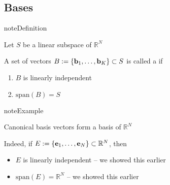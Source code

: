 \documentclass[letterpaper,10pt,english]{jupyterBook}
\begin{document}
\subsection{Bases}
\label{\detokenize{05.linear_algebra:bases}}
\begin{sphinxadmonition}{note}{Definition}

\sphinxAtStartPar
Let \(S\) be a linear subspace of \(\mathbb{R}^N\)

\sphinxAtStartPar
A set of vectors \(B := \{{\bf b}_1, \ldots, {\bf b}_K\} \subset S\) is
called a  if
\begin{enumerate}
%
\item {} 
\sphinxAtStartPar
\(B\) is linearly independent

\item {} 
\sphinxAtStartPar
\(\mathrm{span}(B) = S\)

\end{enumerate}
\end{sphinxadmonition}

\begin{sphinxadmonition}{note}{Example}

\sphinxAtStartPar
Canonical basis vectors form a basis of \(\mathbb{R}^N\)
\end{sphinxadmonition}

\sphinxAtStartPar
Indeed, if \(E := \{{\bf e}_1, \ldots, {\bf e}_N\} \subset \mathbb{R}^N\), then
\begin{itemize}
\item {} 
\sphinxAtStartPar
\(E\) is linearly independent – we showed this earlier

\item {} 
\sphinxAtStartPar
\(\mathrm{span}(E) = \mathbb{R}^N\) – we showed this earlier

\end{itemize}
\end{document}
